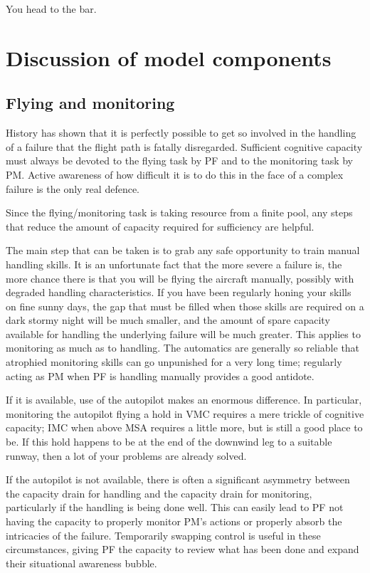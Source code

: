 \documentclass[a5paper,11pt,titlepage]{article}
\begin{document}
You head to the bar.

\section{Discussion of model components}

\subsection{Flying and monitoring}

History has shown that it is perfectly possible to get so involved in
the handling of a failure that the flight path is fatally
disregarded. Sufficient cognitive capacity must always be devoted to
the flying task by PF and to the monitoring task by PM. Active awareness
of how difficult it is to do this in the face of a complex failure is
the only real defence.

Since the flying/monitoring task is taking resource from a finite pool,
any steps that reduce the amount of capacity required for sufficiency
are helpful.

The main step that can be taken is to grab any safe opportunity to train
manual handling skills. It is an unfortunate fact that the more severe a
failure is, the more chance there is that you will be flying the
aircraft manually, possibly with degraded handling characteristics. If
you have been regularly honing your skills on fine sunny days, the gap
that must be filled when those skills are required on a dark stormy
night will be much smaller, and the amount of spare capacity available
for handling the underlying failure will be much greater. This applies
to monitoring as much as to handling. The automatics are generally so
reliable that atrophied monitoring skills can go unpunished for a very
long time; regularly acting as PM when PF is handling manually provides
a good antidote.

If it is available, use of the autopilot makes an enormous
difference. In particular, monitoring the autopilot flying a hold in VMC
requires a mere trickle of cognitive capacity; IMC when above MSA
requires a little more, but is still a good place to be. If this hold
happens to be at the end of the downwind leg to a suitable runway, then
a lot of your problems are already solved.

If the autopilot is not available, there is often a significant
asymmetry between the capacity drain for handling and the capacity drain
for monitoring, particularly if the handling is being done well. This
can easily lead to PF not having the capacity to properly monitor PM's
actions or properly absorb the intricacies of the failure. Temporarily
swapping control is useful in these circumstances, giving PF the
capacity to review what has been done and expand their situational
awareness bubble.
\end{document}
